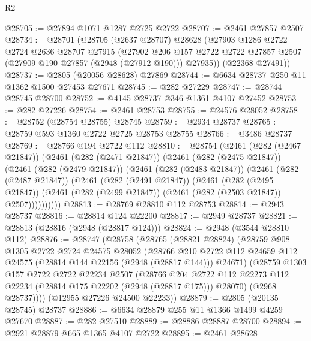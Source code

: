 \begin{lexlean}{R2}
\begin{coremodule}
@28705 := @27894 @1071 @1287 @2725 @2722
@28707 := @2461 @27857 @2507
@28734 := @28701
    (@28705
      (@2637 @28707)
      @28628
      (@27903
        @1286
        @2722
        @2724
        @2636
        @28707
        @27915
        (@27902
          @206
          @157
          @2722
          @2722
          @27857
          @2507
          (@27909 @190 @27857 (@2948 (@27912 @190)))
          @27935))
      (@22368 @27491))
@28737 := @2805 (@20056 @28628) @27869
@28744 := @6634 @28737 @250 @11 @1362 @1500 @27453 @27671
@28745 := @282 @27229
@28747 := @28744 @28745 @28700
@28752 := @4145 @28737 @346 @1361 @4107 @27452
@28753 := @282 @27226
@28754 := @2461 @28753
@28755 := @24576 @28052
@28758 := @28752 (@28754 @28755) @28745
@28759 := @2934 @28737
@28765 := @28759 @593 @1360 @2722 @2725 @28753 @28755
@28766 := @3486 @28737
@28769 := @28766 @194 @2722 @112
@28810 := @28754
    (@2461
      (@282 (@2467 @21847))
      (@2461
        (@282 (@2471 @21847))
        (@2461
          (@282 (@2475 @21847))
          (@2461
            (@282 (@2479 @21847))
            (@2461
              (@282 (@2483 @21847))
              (@2461
                (@282 (@2487 @21847))
                (@2461
                  (@282 (@2491 @21847))
                  (@2461
                    (@282 (@2495 @21847))
                    (@2461 (@282 (@2499 @21847)) (@2461 (@282 (@2503 @21847)) @2507))))))))))
@28813 := @28769 @28810 @112 @28753
@28814 := @2943 @28737
@28816 := @28814 @124 @22200
@28817 := @2949 @28737
@28821 := @28813 (@28816 (@2948 (@28817 @124)))
@28824 := @2948 (@3544 @28810 @112)
@28876 := @28747
    (@28758
      (@28765
        (@28821 @28824)
        (@28759
          @908
          @1305
          @2722
          @2724
          @24575
          @28052
          (@28766
            @210
            @2722
            @112
            @24659
            @112
            @24575
            (@28814 @144 @22156 (@2948 (@28817 @144)))
            @24671)
          (@28759
            @1303
            @157
            @2722
            @2722
            @22234
            @2507
            (@28766
              @204
              @2722
              @112
              @22273
              @112
              @22234
              (@28814 @175 @22202 (@2948 (@28817 @175)))
              @28070)
            (@2968 @28737))))
      (@12955 @27226 @24500 @22233))
@28879 := @2805 (@20135 @28745) @28737
@28886 := @6634 @28879 @255 @11 @1366 @1499 @4259 @27670
@28887 := @282 @27510
@28889 := @28886 @28887 @28700
@28894 := @2921 @28879 @665 @1365 @4107 @2722
@28895 := @2461 @28628

\end{coremodule}
\end{lexlean}
